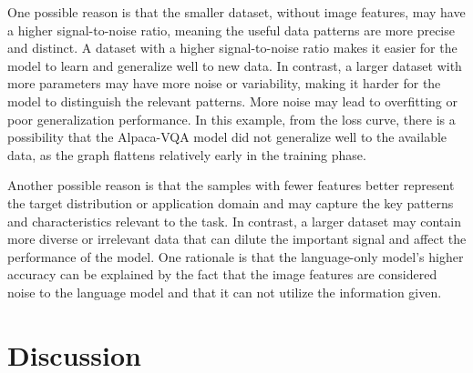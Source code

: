         One possible reason is that the smaller dataset, without image features, may have a higher signal-to-noise ratio, meaning the useful data patterns are more precise and distinct. A dataset with a higher signal-to-noise ratio makes it easier for the model to learn and generalize well to new data. In contrast, a larger dataset with more parameters may have more noise or variability, making it harder for the model to distinguish the relevant patterns. 
        More noise may lead to overfitting or poor generalization performance. In this example, from the loss curve, there is a possibility that the Alpaca-VQA model did not generalize well to the available data, as the graph flattens relatively early in the training phase.
        
        Another possible reason is that the samples with fewer features better represent the target distribution or application domain and may capture the key patterns and characteristics relevant to the task. In contrast, a larger dataset may contain more diverse or irrelevant data that can dilute the important signal and affect the performance of the model. One rationale is that the language-only model's higher accuracy can be explained by the fact that the image features are considered noise to the language model and that it can not utilize the information given.

          
        

      

\section{Discussion}
\label{4_discussion}





